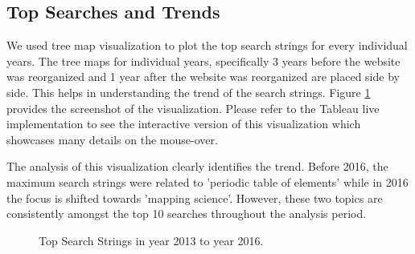 \subsection{Top Searches and Trends} \label{viztopsearches}
We used tree map visualization to plot the top search strings for every
individual years. The tree maps for individual years, specifically 3 years
before the website was reorganized and 1 year after the website was
reorganized are placed side by side. This helps in understanding the trend of
 the search strings. Figure \ref{fig:topsearches} provides the screenshot of
 the visualization. Please refer to the Tableau live implementation to see
 the interactive version of this visualization which showcases many details
 on the mouse-over.

The analysis of this visualization clearly identifies the trend. Before 2016,
 the maximum search strings were related to 'periodic table of elements'
 while in 2016 the focus is shifted towards 'mapping science'. However, these
   two topics are consistently amongst the top 10 searches throughout the
   analysis period.

\begin{figure}
\centering
{}
\caption{Top Search Strings in year 2013 to year 2016.}
\label{fig:topsearches}
\end{figure}
